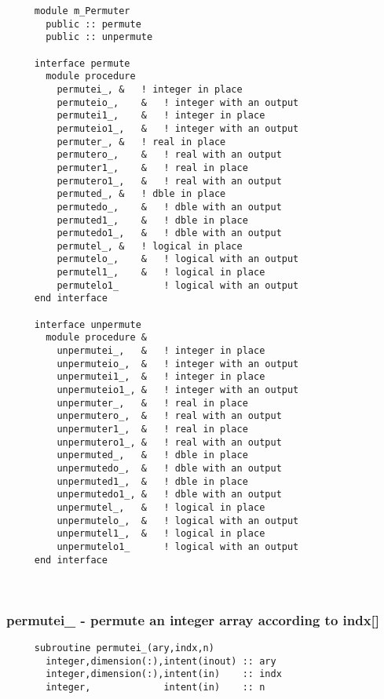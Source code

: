 \begin{verbatim} 
     module m_Permuter
       public :: permute	
       public :: unpermute
 
     interface permute
       module procedure	
         permutei_,	&	! integer in place
         permuteio_,	&	! integer with an output
         permutei1_,	&	! integer in place
         permuteio1_,	&	! integer with an output
         permuter_,	&	! real in place
         permutero_,	&	! real with an output
         permuter1_,	&	! real in place
         permutero1_,	&	! real with an output
         permuted_,	&	! dble in place
         permutedo_,	&	! dble with an output
         permuted1_,	&	! dble in place
         permutedo1_,	&	! dble with an output
         permutel_,	&	! logical in place
         permutelo_,	&	! logical with an output
         permutel1_,	&	! logical in place
         permutelo1_		! logical with an output
     end interface
 
     interface unpermute
       module procedure	&
         unpermutei_,	&	! integer in place
         unpermuteio_,	&	! integer with an output
         unpermutei1_,	&	! integer in place
         unpermuteio1_,	&	! integer with an output
         unpermuter_,	&	! real in place
         unpermutero_,	&	! real with an output
         unpermuter1_,	&	! real in place
         unpermutero1_,	&	! real with an output
         unpermuted_,	&	! dble in place
         unpermutedo_,	&	! dble with an output
         unpermuted1_,	&	! dble in place
         unpermutedo1_,	&	! dble with an output
         unpermutel_,	&	! logical in place
         unpermutelo_,	&	! logical with an output
         unpermutel1_,	&	! logical in place
         unpermutelo1_		! logical with an output
     end interface
 \end{verbatim}%
 
 
\mbox{}\hrulefill\ 
 

  \subsubsection{permutei\_ - permute an integer array according to indx[]}

\begin{verbatim} 
     subroutine permutei_(ary,indx,n)
       integer,dimension(:),intent(inout) :: ary
       integer,dimension(:),intent(in)    :: indx
       integer,             intent(in)    :: n
 \end{verbatim}%
% 
 
